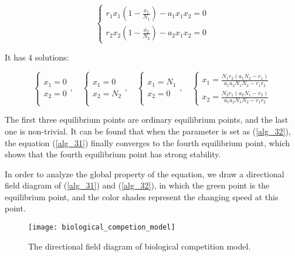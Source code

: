 \documentclass{mcmthesis}
\begin{document}
\begin{equation}
  \left\{\begin{array}{l}
    r_{1} x_{1}\left(1-\frac{x_{1}}{N_{1}}\right)-a_{1} x_{1} x_{2}=0 \\
    r_{2} x_{2}\left(1-\frac{x_{2}}{N_{2}}\right)-a_{2} x_{1} x_{2}=0
    \end{array}\right.
\end{equation}

It has 4 solutions:

\begin{equation}
  \left\{\begin{array}{l}
    x_{1}=0 \\
    x_{2}=0
    \end{array}, \quad\left\{\begin{array}{l}
    x_{1}=0 \\
    x_{2}=N_{2}
    \end{array}, \quad\left\{\begin{array}{l}
    x_{1}=N_{1} \\
    x_{2}=0
    \end{array}, \quad\left\{\begin{array}{l}
    x_{1}=\frac{N_{1} r_{2}\left(a_{1} N_{2}-r_{1}\right)}{a_{1} a_{2} N_{1} N_{2}-r_{1} r_{2}} \\
    x_{2}=\frac{N_{2} r_{1}\left(a_{2} N_{1}-r_{2}\right)}{a_{1} a_{2} N_{1} N_{2}-r_{1} r_{2}}
    \end{array}\right.\right.\right.\right.
\end{equation}

The first three equilibrium points are ordinary equilibrium points, and the last one is non-trivial. It can be found that when the parameter is set as (\ref{alg_32}), the equation (\ref{alg_31}) finally converges to the fourth equilibrium point, which shows that the fourth equilibrium point has strong stability.

In order to analyze the global property of the equation, we draw a directional field diagram of (\ref{alg_31}) and (\ref{alg_32}), in which the green point is the equilibrium point, and the color shades represent the changing speed at this point.

\begin{figure}[H]
  \small
  \centering
  \texttt{[image: biological\_competion\_model]}
  \caption{The directional field diagram of biological competition model.}
  \label{biological_competion_model}
\end{figure}
\end{document}
